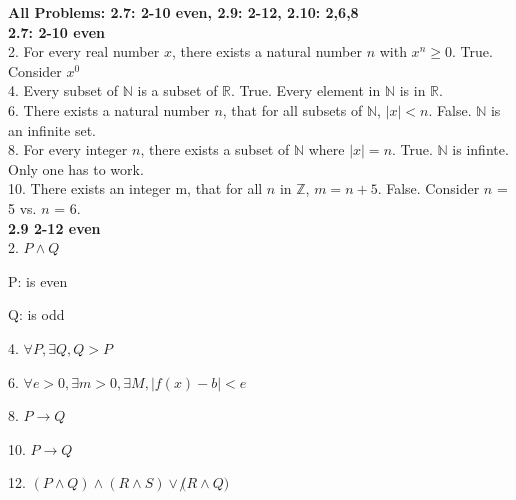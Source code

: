 \documentclass[12pt]{article}
\def\R{\mathbb R}							%
\def\Z{\mathbb Z}
\def\N{\mathbb N}
\begin{document}
{\bf All Problems: 2.7: 2-10 even, 2.9: 2-12, 2.10: 2,6,8}\\

{\bf 2.7: 2-10 even}\\

2. For every real number $x$, there exists a natural number $n$
with $x^n$$\geq 0$.
True. Consider $x^0$\\

4. Every subset of $\N$ is a subset of $\R$.
True. Every element in $\N$ is in $\R$.\\

6. There exists a natural number $n$, that for all subsets of $\N$, $|x|<n$.
False. $\N$ is an infinite set.\\

8. For every integer $n$, there exists a subset of $\N$ where $|x|=n$.
True. $\N$ is infinte. Only one has to work.\\

10. There exists an integer m, that for all $n$ in $\Z$, $m=n+5$.
False. Consider $n$ = 5 vs. $n$ = 6.\\

{\bf 2.9 2-12 even}\\ 

2. $P\land Q$

P: is even

Q: is odd

4. $\forall P, \exists Q, Q>P$

6. $\forall e > 0, \exists m > 0, \exists M, |f(x)-b|< e$

8. $P\rightarrow Q$

10. $P\rightarrow Q$

12. $(P\land Q)\land (R\land S)\lor \not(R\land Q)$
\end{document}
